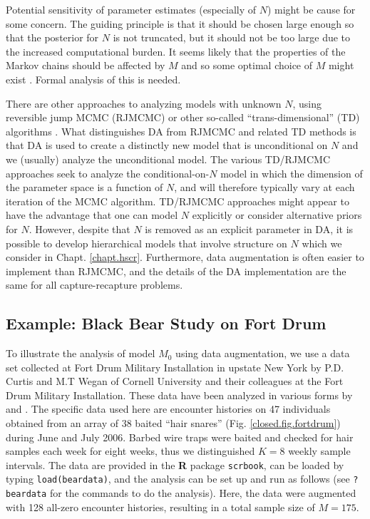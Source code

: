 Potential sensitivity of parameter estimates (especially of $N$) might
be cause for some concern.
The guiding principle is
that it should be chosen large enough so that the posterior for $N$ is
not truncated, but it should not be too large due to the increased
computational burden. It seems likely that the properties of the
Markov chains should be affected by $M$ and so some optimal choice of
$M$ might exist \citep{gopalaswamy:2012}.
Formal analysis of this is needed.

There are other approaches to analyzing models with unknown $N$, using
reversible jump MCMC (RJMCMC) or other so-called ``trans-dimensional''
(TD) algorithms \citep{king_brooks:2001, durban_elston:2005,
  king_etal:2008, schofield_barker:2008, wright_etal:2009}.  What
distinguishes DA from RJMCMC and related TD methods is that DA is used
to create a distinctly new model that is unconditional on $N$ and we
(usually) analyze the unconditional model. The various TD/RJMCMC
approaches seek to analyze the conditional-on-$N$ model in which the
dimension of the parameter space is a function of $N$, and will
therefore typically vary at each iteration of the MCMC
algorithm. TD/RJMCMC approaches might appear to have the advantage
that one can model $N$ explicitly or consider alternative priors for
$N$. However, despite that $N$ is removed as an explicit parameter in
DA, it is possible to develop hierarchical models that involve
structure on $N$ \citep{converse_royle:2012, royle_etal:2012arXiv, royle_converse:2013} which
we consider in Chapt. \ref{chapt.hscr}. Furthermore, data augmentation
is often easier to implement than RJMCMC, and the details of the
DA implementation are the same for all capture-recapture problems.


\subsection{Example: Black Bear Study on Fort Drum}

To illustrate the analysis of model $M_0$ using data augmentation, we use
a data set collected at Fort Drum Military Installation in upstate New
York by P.D. Curtis and M.T Wegan of Cornell University and
their colleagues at the Fort Drum Military Installation.
These data have been analyzed in various forms by
\citet{wegan:2008,gardner_etal:2009} and \citet{gardner_etal:2010jwm}.
The specific data used here are encounter histories on 47 individuals
obtained from an array of 38 baited ``hair snares''
(Fig. \ref{closed.fig.fortdrum}) during June and July 2006.  Barbed wire
traps were baited and checked for hair samples each week for eight
weeks, thus we distinguished $K=8$ weekly sample intervals. The data are provided
in the {\bf R} package \mbox{\tt scrbook}, can be loaded by typing
\mbox{\tt load(beardata)},
and the analysis can be set up and run as
follows (see \mbox{\tt ?beardata} for the commands to do the
analysis).
Here, the data were augmented with 128
all-zero encounter histories, resulting in a total sample size of $M=175$.

